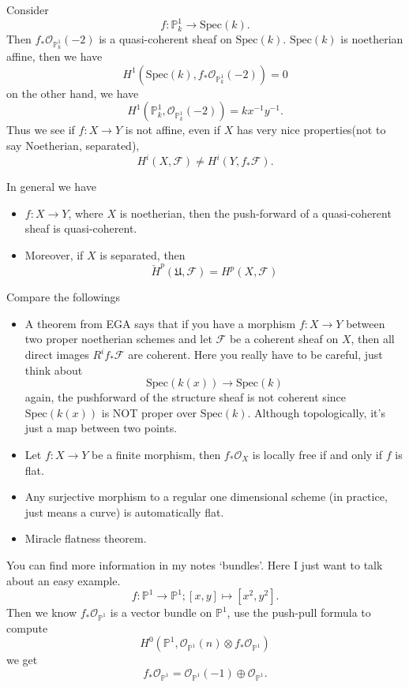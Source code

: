 \documentclass[../main.tex]{subfiles}
\begin{document}
\begin{example}
Consider $$f:\mathbb{P}_{k}^{1}\rightarrow \mathrm{Spec}(k).$$
Then $f_{*}\mathcal{O}_{\mathbb{P}_{k}^{1}}(-2)$ is a quasi-coherent sheaf on $\mathrm{Spec}(k)$. $\mathrm{Spec}(k)$ is noetherian affine, then we have $$H^{1}(\mathrm{Spec}(k),f_{*}\mathcal{O}_{\mathbb{P}_{k}^{1}}(-2))=0$$
on the other hand, we have 
$$H^{1}(\mathbb{P}_{k}^{1}, \mathcal{O}_{\mathbb{P}_{k}^{1}}(-2))=kx^{-1}y^{-1}.$$
Thus we see if $f:X\rightarrow Y$ is not affine, even if $X$ has very nice properties(not to say Noetherian, separated), 
$$H^{i}(X,\mathscr{F})\neq H^{i}(Y, f_{*}\mathscr{F}).$$
\end{example}
\begin{remark}
In general we have
\begin{itemize}
\item $f:X\rightarrow Y$, where $X$ is noetherian, then the push-forward of a quasi-coherent sheaf is quasi-coherent.
\item Moreover, if $X$ is separated, then $$\check{H}^{p}(\mathfrak{U},\mathscr{F})=H^{p}(X,\mathscr{F})$$
\end{itemize}
\end{remark}
\begin{example}
Compare the followings
\begin{itemize}
\item A theorem from EGA says that if you have a morphism $f:X\rightarrow Y$ between two proper noetherian schemes and let $\mathscr{F}$ be a coherent sheaf on $X$, then all direct images $R^{i}f_{*}\mathscr{F}$ are coherent. Here you really have to be careful, just think about 
$$\mathrm{Spec}(k(x))\rightarrow \mathrm{Spec}(k)$$
again, the pushforward of the structure sheaf is not coherent since $\mathrm{Spec}(k(x))$ is NOT proper over $\mathrm{Spec}(k)$. Although topologically, it's just a map between two points.
\item Let $f:X\rightarrow Y$ be a finite morphism, then $f_{*}\mathcal{O}_{X}$ is locally free if and only if $f$ is flat. 
\item Any surjective morphism to a regular one dimensional scheme (in practice, just means a curve) is automatically flat.
\item Miracle flatness theorem.
\end{itemize}
\end{example}
\begin{example}
You can find more information in my notes `bundles'. Here I just want to talk about an easy example. 
$$f:\mathbb{P}^{1}\rightarrow \mathbb{P}^{1};[x,y]\mapsto [x^{2}, y^{2}].$$
Then we know $f_{*}\mathcal{O}_{\mathbb{P}^{1}}$ is a vector bundle on $\mathbb{P}^{1}$, use the push-pull formula to compute 
$$H^{0}(\mathbb{P}^{1}, \mathcal{O}_{\mathbb{P}^{1}}(n)\otimes f_{*}\mathcal{O}_{\mathbb{P}^{1}})$$
we get $$f_{*}\mathcal{O}_{\mathbb{P}^{1}}=\mathcal{O}_{\mathbb{P}^{1}}(-1)\oplus \mathcal{O}_{\mathbb{P}^{1}}.$$
\end{example}
\end{document}
